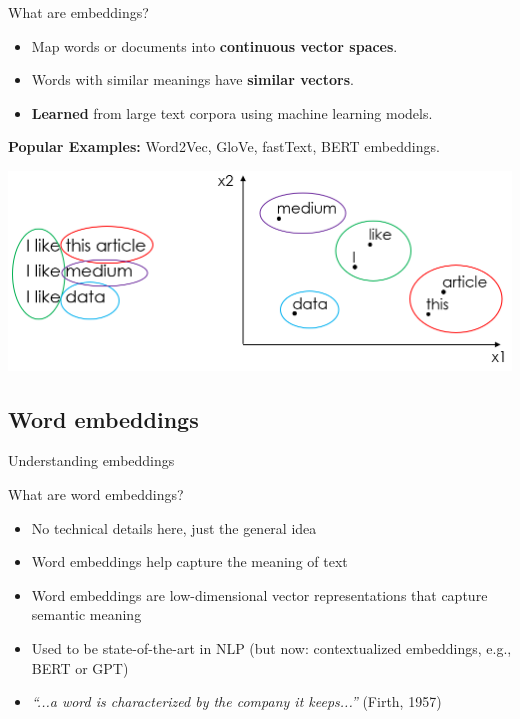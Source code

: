 \documentclass[handout]{beamer}
\begin{document}
\begin{frame}{What are embeddings?}
    \begin{itemize}
        \item Map words or documents into \textbf{continuous vector spaces}.
        \item Words with similar meanings have \textbf{similar vectors}.
        \item \textbf{Learned} from large text corpora using machine learning models.
    \end{itemize}
    \pause
    \textbf{Popular Examples:} Word2Vec, GloVe, fastText, BERT embeddings.
    \newline
    \begin{center}
        \includegraphics[width=0.8\linewidth]{resources/pictures/tfidf-vs-embeddings.png}  %
    \end{center}
\end{frame}

\subsection{Word embeddings}

\begin{frame}{Understanding embeddings}
	\begin{block}{What are word embeddings?}
		\begin{itemize}[<+>]
			\item No technical details here, just the general idea
			\item Word embeddings help capture the meaning of text
			\item Word embeddings are low-dimensional vector representations that capture semantic meaning
			\item Used to be state-of-the-art in NLP (but now: contextualized embeddings, e.g., BERT or GPT)
			\item \emph{``...a word is characterized by the company it keeps...''} (Firth, 1957)
		\end{itemize}
	\end{block}
\end{frame}
\end{document}
